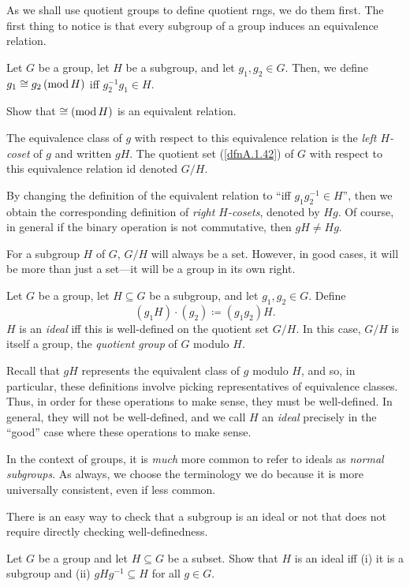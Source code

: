 As we shall use quotient groups to define quotient rngs, we do them first.  The first thing to notice is that every subgroup of a group induces an equivalence relation.
\begin{dfn}\label{Cosets}
Let $G$ be a group, let $H$ be a subgroup, and let $g_1,g_2\in G$.  Then, we define $g_1\cong g_2\left( \mathrm{mod}\, H\right)$ iff $g_2^{-1}g_1\in H$.
\begin{exr}
Show that $\cong \left( \mathrm{mod}\, H\right)$ is an equivalent relation.
\end{exr}
The equivalence class of $g$ with respect to this equivalence relation is the \emph{left $H$-coset} of $g$ and written $gH$.  The quotient set (\cref{dfnA.1.42}) of $G$ with respect to this equivalence relation id denoted $G/H$.
\begin{rmk}
By changing the definition of the equivalent relation to ``\textellipsis iff $g_1g_2^{-1}\in H$'', then we obtain the corresponding definition of \emph{right $H$-cosets}, denoted by $Hg$.  Of course, in general if the binary operation is not commutative, then $gH\neq Hg$.
\end{rmk}
\end{dfn}
For a subgroup $H$ of $G$, $G/H$ will always be a set.  However, in good cases, it will be more than just a set---it will be a group in its own right.
\begin{dfn}\label{IdealsAndQuotientGroups}
Let $G$ be a group, let $H\subseteq G$ be a subgroup, and let $g_1,g_2\in G$.  Define
\begin{equation}
(g_1H)\cdot (g_2)\coloneqq (g_1g_2)H.
\end{equation}
$H$ is an \emph{ideal} iff this is well-defined on the quotient set $G/H$.  In this case, $G/H$ is itself a group, the \emph{quotient group} of $G$ modulo $H$.
\begin{rmk}
Recall that $gH$ represents the equivalent class of $g$ modulo $H$, and so, in particular, these definitions involve picking representatives of equivalence classes.  Thus, in order for these operations to make sense, they must be well-defined.  In general, they will not be well-defined, and we call $H$ an \emph{ideal} precisely in the ``good'' case where these operations to make sense.
\end{rmk}
\begin{rmk}
In the context of groups, it is \emph{much} more common to refer to ideals as \emph{normal subgroups}.  As always, we choose the terminology we do because it is more universally consistent, even if less common.
\end{rmk}
\end{dfn}
There is an easy way to check that a subgroup is an ideal or not that does not require directly checking well-definedness.
\begin{exr}
Let $G$ be a group and let $H\subseteq G$ be a subset.  Show that $H$ is an ideal iff (i) it is a subgroup and (ii) $gHg^{-1}\subseteq H$ for all $g\in G$.
\end{exr}

